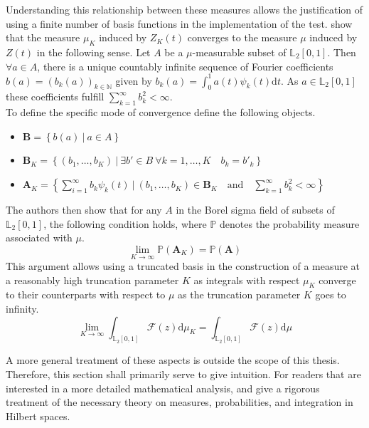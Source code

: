 \documentclass[12pt, a4paper]{article}
\theoremstyle{MAstyle} \newtheorem{assumption}{Assumption}[section]
\theoremstyle{MAstyle} \newtheorem{definition}{Definition}[section]
\theoremstyle{MAstyle} \newtheorem{theorem}{Theorem}[section]
\begin{document}
			Understanding this relationship between these measures allows the justification of using a finite number of basis functions in the implementation of the test.
			\cite{bugni_goodness--fit_2009} show that the measure $\mu_K$ induced by $Z_K(t)$ converges to the measure $\mu$ induced by $Z(t)$ in the following sense. Let $A$ be a $\mu$-measurable subset of $\mathbb{L}_2[0,1]$. Then $\forall a \in A$, there is a unique countably infinite sequence of Fourier coefficients $b(a) = (b_k(a))_{k \in \mathbb{N}}$ given by $b_k(a) = \int_{0}^{1} a(t) \psi_k(t) \mathrm{d}t$. As $a \in \mathbb{L}_2[0,1]$ these coefficients fulfill $\sum_{k = 1}^{\infty} b_k^2 < \infty$. \\
			
			To define the specific mode of convergence \cite{bugni_goodness--fit_2009} define the following objects.
			\begin{itemize}
				\item $\textbf{B} = \left\{b(a) \ \vert \ a \in A\right\}$
				\item $\textbf{B}_K = \left\{\left(b_1, \dots, b_K \right) \ \vert \ \exists b' \in B \  \forall k = 1, \dots, K \quad b_k = b'_k \right\}$
				\item $\textbf{A}_K = \left\{ \sum_{i = 1}^{\infty} b_k \psi_k(t) \ \vert \ \left(b_1, \dots, b_K \right) \in \textbf{B}_K \quad \text{and} \quad \sum_{k = 1}^{\infty} b_k^2 < \infty \right\}$
			\end{itemize}
			The authors then show that for any $A$ in the Borel sigma field of subsets of $\mathbb{L}_2[0,1]$, the following condition holds, where $\mathbb{P}$ denotes the probability measure associated with $\mu$.
			\begin{equation}
				\lim_{K \rightarrow \infty} \mathbb{P}(\textbf{A}_K) = \mathbb{P}(\textbf{A})
			\end{equation}
			This argument allows using a truncated basis in the construction of a measure at a reasonably high truncation parameter $K$ as integrals with respect $\mu_K$ converge to their counterparts with respect to $\mu$ as the truncation parameter $K$ goes to infinity.
			\begin{equation}
				\lim_{K \rightarrow \infty} \int_{\mathbb{L}_2[0,1]} \mathcal{F}(z) \mathrm{d}\mu_K = \int_{\mathbb{L}_2[0,1]} \mathcal{F}(z) \mathrm{d}\mu
			\end{equation}
			
			A more general treatment of these aspects is outside the scope of this thesis. Therefore, this section shall primarily serve to give intuition. For readers that are interested in a more detailed mathematical analysis, \cite{gihman_theory_2004} and \cite{skorohod_integration_1974} give a rigorous treatment of the necessary theory on measures, probabilities, and integration in Hilbert spaces. 
		
\end{document}
